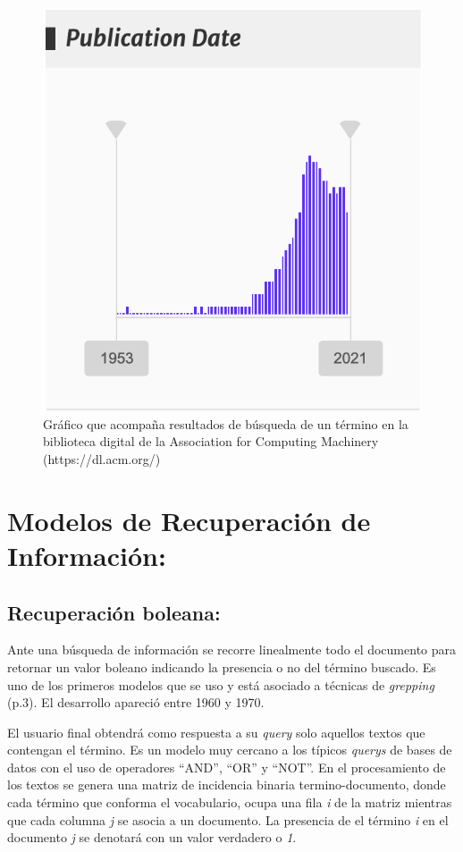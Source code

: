 \documentclass[
  10,
  openany]{book}
\begin{document}
\begin{figure}

{\centering \includegraphics[width=0.4\linewidth]{images/02-marco-teorico/busquedaacm} 

}

\caption{Gráfico que acompaña resultados de búsqueda de un término en la biblioteca digital de la Association for Computing Machinery (https://dl.acm.org/)}\label{fig:busquedasacm}
\end{figure}

\hypertarget{modelos-de-recuperaciuxf3n-de-informaciuxf3n}{%
\section{Modelos de Recuperación de Información:}\label{modelos-de-recuperaciuxf3n-de-informaciuxf3n}}

\hypertarget{recuperaciuxf3n-boleana}{%
\subsection{Recuperación boleana:}\label{recuperaciuxf3n-boleana}}

Ante una búsqueda de información se recorre linealmente todo el documento para retornar un valor boleano indicando la presencia o no del término buscado. Es uno de los primeros modelos que se uso y está asociado a técnicas de \emph{grepping} \citep{manning2008} (p.3). El desarrollo apareció entre 1960 y 1970.

El usuario final obtendrá como respuesta a su \emph{query} solo aquellos textos que contengan el término. Es un modelo muy cercano a los típicos \emph{querys} de bases de datos con el uso de operadores ``AND'', ``OR'' y ``NOT''. En el procesamiento de los textos se genera una matriz de incidencia binaria termino-documento, donde cada término que conforma el vocabulario, ocupa una fila \emph{i} de la matriz mientras que cada columna \emph{j} se asocia a un documento. La presencia de el término \emph{i} en el documento \emph{j} se denotará con un valor verdadero o \emph{1}.
\end{document}
